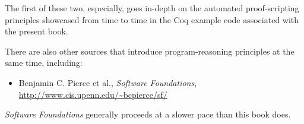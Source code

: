 \documentclass{amsbook}
\theoremstyle{definition}
\theoremstyle{remark}
\numberwithin{section}{chapter}
\numberwithin{equation}{chapter}
\begin{document}
The first of these two, especially, goes in-depth on the automated proof-scripting principles showcased from time to time in the Coq example code associated with the present book.

There are also other sources that introduce program-reasoning principles at the same time, including:

\begin{itemize}
  \item Benjamin C. Pierce et al., \emph{Software Foundations}, \url{http://www.cis.upenn.edu/~bcpierce/sf/}
\end{itemize}

\emph{Software Foundations} generally proceeds at a slower pace than this book does.

\backmatter
\printindex
\end{document}
